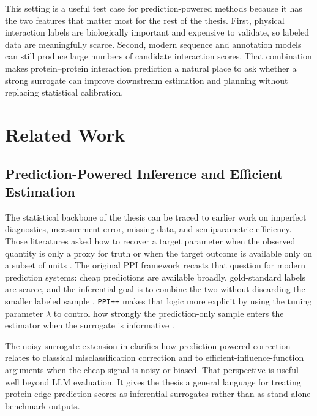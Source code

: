 This setting is a useful test case for prediction-powered methods because it has the two features that matter most for the rest of the thesis. First, physical interaction labels are biologically important and expensive to validate, so labeled data are meaningfully scarce. Second, modern sequence and annotation models can still produce large numbers of candidate interaction scores. That combination makes protein--protein interaction prediction a natural place to ask whether a strong surrogate can improve downstream estimation and planning without replacing statistical calibration.

\section[Related Work]{Related Work}

\subsection[Prediction-Powered Inference and Efficiency]{Prediction-Powered Inference and Efficient Estimation}

The statistical backbone of the thesis can be traced to earlier work on imperfect diagnostics, measurement error, missing data, and semiparametric efficiency. Those literatures asked how to recover a target parameter when the observed quantity is only a proxy for truth or when the target outcome is available only on a subset of units \parencite{rubin1976, rogan_gladen, eif_ref, robins1995, tsiatis2006}. The original PPI framework recasts that question for modern prediction systems: cheap predictions are available broadly, gold-standard labels are scarce, and the inferential goal is to combine the two without discarding the smaller labeled sample \parencite{ppi_framework}. \texttt{PPI++} makes that logic more explicit by using the tuning parameter $\lambda$ to control how strongly the prediction-only sample enters the estimator when the surrogate is informative \parencite{ppi_pp}.

The noisy-surrogate extension in \textcite{llmjudge_eif} clarifies how prediction-powered correction relates to classical misclassification correction and to efficient-influence-function arguments when the cheap signal is noisy or biased. That perspective is useful well beyond LLM evaluation. It gives the thesis a general language for treating protein-edge prediction scores as inferential surrogates rather than as stand-alone benchmark outputs.

